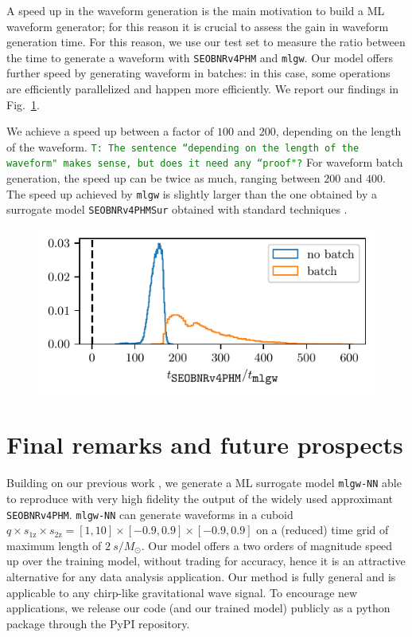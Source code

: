 \documentclass[twocolumn,showpacs,preprintnumbers,nofootinbib,prd,
superscriptaddress,10pt]{revtex4-1}
\newcommand{\tim}[1]{{\textcolor{green}{\texttt{T: #1}} }}
\begin{document}
{A speed up in the waveform generation is the main motivation to build a ML waveform generator; for this reason it is crucial to assess the gain in waveform generation time.
For this reason, we use our test set to measure the ratio between the time to generate a waveform with \texttt{SEOBNRv4PHM} and \texttt{mlgw}. Our model offers further speed by generating waveform in batches: in this case, some operations are efficiently parallelized and happen more efficiently.
We report our findings in Fig.~\ref{fig:timing_hist}.

We achieve a speed up between a factor of $100$ and $200$, depending on the length of the waveform. \tim{The sentence ``depending on the length of the waveform" makes sense, but does it need any ``proof"?} For waveform batch generation, the speed up can be twice as much, ranging between $200$ and $400$.
The speed up achieved by \texttt{mlgw} is slightly larger than the one obtained by a surrogate model \texttt{SEOBNRv4PHMSur} obtained with standard techniques \cite{Gadre:2022sed}.

\begin{figure}[t]
	\centering
	\includegraphics[scale = 1]{timing}
	\caption{}
	\label{fig:timing_hist}
\end{figure}


\section{Final remarks and future prospects}
\label{sec:end}

Building on our previous work \cite{Schmidt:2020yuu}, we generate a ML surrogate model \texttt{mlgw-NN} able to reproduce with very high fidelity the output of the widely used approximant \texttt{SEOBNRv4PHM}. \texttt{mlgw-NN} can generate waveforms in a cuboid $q\times s_\text{1z} \times s_\text{2z} = [1,10]\times[-0.9,0.9]\times[-0.9,0.9]$ on a (reduced) time grid of maximum length of $\SI{2}{s/M_\odot}$.
Our model offers a two orders of magnitude speed up over the training model, without trading for accuracy, hence it is an attractive alternative for any data analysis application.
Our method is fully general and is applicable to any chirp-like gravitational wave signal.
To encourage new applications, we release our code (and our trained model) publicly as a python package through the PyPI repository.

}
\end{document}
